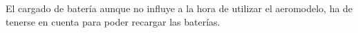 
El cargado de batería aunque no influye a la hora de utilizar el aeromodelo, ha de tenerse en cuenta para poder recargar las baterías.


